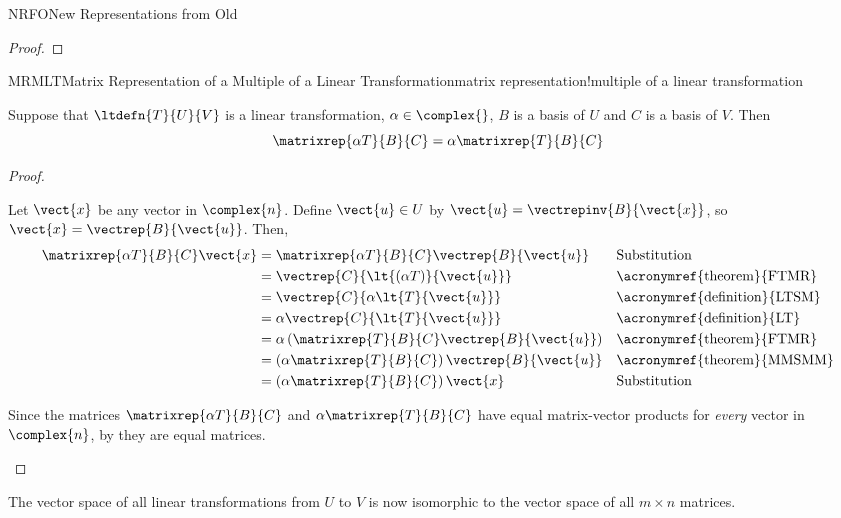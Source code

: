 \begin{subsect}{NRFO}{New Representations from Old}
\begin{proof}
%
\end{proof}
%
%
\begin{theorem}{MRMLT}{Matrix Representation of a Multiple of a Linear Transformation}{matrix representation!multiple of a linear transformation}
\begin{para}Suppose that $\ltdefn{T}{U}{V}$ is a linear transformation, $\alpha\in\complex{\null}$, $B$ is a basis of $U$ and $C$ is a basis of $V$.  Then
%
\begin{equation*}
\matrixrep{\alpha T}{B}{C}=\alpha\matrixrep{T}{B}{C}
\end{equation*}
\end{para}
%
\end{theorem}
%
\begin{proof}
\begin{para}Let $\vect{x}$ be any vector in $\complex{n}$.  Define $\vect{u}\in U$ by $\vect{u}=\vectrepinv{B}{\vect{x}}$, so $\vect{x}=\vectrep{B}{\vect{u}}$.  Then,
%
\begin{align*}
\matrixrep{\alpha T}{B}{C}\vect{x}&=
\matrixrep{\alpha T}{B}{C}\vectrep{B}{\vect{u}}&&\text{Substitution}\\
&=\vectrep{C}{\lt{\left(\alpha T\right)}{\vect{u}}}&&\text{\acronymref{theorem}{FTMR}}\\
&=\vectrep{C}{\alpha\lt{T}{\vect{u}}}&&\text{\acronymref{definition}{LTSM}}\\
&=\alpha\vectrep{C}{\lt{T}{\vect{u}}}&&\text{\acronymref{definition}{LT}}\\
&=\alpha\left(\matrixrep{T}{B}{C}\vectrep{B}{\vect{u}}\right)&&\text{\acronymref{theorem}{FTMR}}\\
&=\left(\alpha\matrixrep{T}{B}{C}\right)\vectrep{B}{\vect{u}}&&\text{\acronymref{theorem}{MMSMM}}\\
&=\left(\alpha\matrixrep{T}{B}{C}\right)\vect{x}&&\text{Substitution}
\end{align*}
\end{para}
%
\begin{para}Since the matrices $\matrixrep{\alpha T}{B}{C}$ and $\alpha\matrixrep{T}{B}{C}$ have equal matrix-vector products for {\em every} vector in $\complex{n}$,  by  they are equal matrices.\end{para}
%
\end{proof}
%
\begin{para}The vector space of all linear transformations from $U$ to $V$ is now isomorphic to the vector space of all $m\times n$ matrices.\end{para}

\end{subsect}
